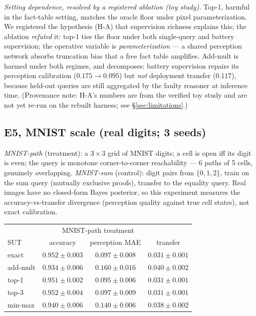 \documentclass[10pt]{article}
\theoremstyle{remark}
\begin{document}
\emph{Setting dependence, resolved by a registered ablation (toy study).} Top-1, harmful in the
fact-table setting, matches the oracle floor under pixel parameterization. We registered the
hypothesis (H-A) that supervision richness explains this; the ablation \emph{refuted} it: top-1
ties the floor under both single-query and battery supervision; the operative variable is
\emph{parameterization} --- a shared perception network absorbs truncation bias that a free fact
table amplifies. Add-mult is harmed under both regimes, and decomposes: battery supervision
repairs its perception calibration ($0.175 \to 0.095$) but \emph{not} deployment transfer
($0.117$), because held-out queries are still aggregated by the faulty reasoner at inference time.
(Provenance note: H-A's numbers are from the verified toy study and are not yet re-run on the
rebuilt harness; see \S\ref{sec:limitations}.)

\subsection{E5, MNIST scale (real digits; 3 seeds)}

\emph{MNIST-path} (treatment): a $3{\times}3$ grid of MNIST digits; a cell is open iff its digit
is even; the query is monotone corner-to-corner reachability --- 6 paths of 5 cells, genuinely
overlapping. \emph{MNIST-sum} (control): digit pairs from $\{0,1,2\}$, train on the sum query
(mutually exclusive proofs), transfer to the equality query. Real images have no closed-form
Bayes posterior, so this experiment measures the accuracy-vs-transfer divergence (perception
quality against true cell states), not exact calibration.

\begin{center}\small
\begin{tabular}{lccc}
\toprule
\multicolumn{4}{c}{MNIST-path treatment}\\
SUT & accuracy & perception MAE & transfer\\
\midrule
exact & $0.952 \pm 0.003$ & $0.097 \pm 0.008$ & $0.031 \pm 0.001$\\
add-mult & $0.934 \pm 0.006$ & $0.160 \pm 0.016$ & $0.040 \pm 0.002$\\
top-1 & $0.951 \pm 0.002$ & $0.095 \pm 0.006$ & $0.031 \pm 0.001$\\
top-3 & $0.952 \pm 0.004$ & $0.097 \pm 0.009$ & $0.031 \pm 0.001$\\
min-max & $0.940 \pm 0.006$ & $0.140 \pm 0.006$ & $0.038 \pm 0.002$\\
\bottomrule
\end{tabular}
\end{center}
\end{document}
